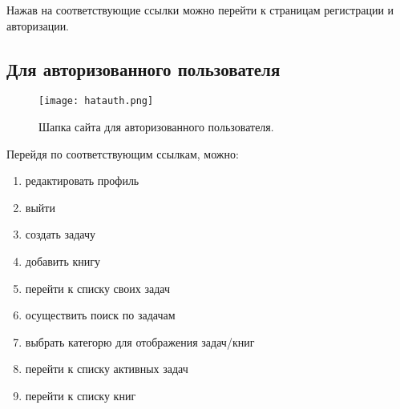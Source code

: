 Нажав на соответствующие ссылки можно перейти к страницам регистрации и авторизации.

\subsection{Для авторизованного пользователя} 

\begin{figure}[h]
  \centering
  \texttt{[image: hatauth.png]}
  \caption{ Шапка сайта для авторизованного пользователя.}
\end{figure}

Перейдя по соответствующим ссылкам, можно:
\begin{enumerate}
\item редактировать профиль
\item выйти
\item создать задачу
\item добавить книгу
\item перейти к списку своих задач
\item осуществить поиск по задачам
\item выбрать категорю для отображения задач/книг
\item перейти к списку активных задач
\item перейти к списку книг
\end{enumerate}